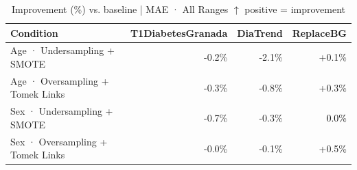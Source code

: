 \begin{table}[htbp]
\centering
\small
\caption{Improvement (\%) vs. baseline  |  MAE · All Ranges  $\uparrow$ positive = improvement}
\label{tab:delta_mae_entire_family_mechanism_random+guided}
\begin{tabular}{lrrr}
\toprule
\textbf{Condition} & \textbf{T1DiabetesGranada} & \textbf{DiaTrend} & \textbf{ReplaceBG} \\
\midrule
Age · Undersampling + SMOTE & \textcolor{BrickRed}{-0.2\%} & \textcolor{BrickRed}{-2.1\%} & \textcolor{OliveGreen}{+0.1\%} \\
Age · Oversampling + Tomek Links & \textcolor{BrickRed}{-0.3\%} & \textcolor{BrickRed}{-0.8\%} & \textcolor{OliveGreen}{+0.3\%} \\
\midrule
Sex · Undersampling + SMOTE & \textcolor{BrickRed}{-0.7\%} & \textcolor{BrickRed}{-0.3\%} & \textcolor{black}{0.0\%} \\
Sex · Oversampling + Tomek Links & \textcolor{BrickRed}{-0.0\%} & \textcolor{BrickRed}{-0.1\%} & \textcolor{OliveGreen}{+0.5\%} \\
\bottomrule
\end{tabular}
\end{table}